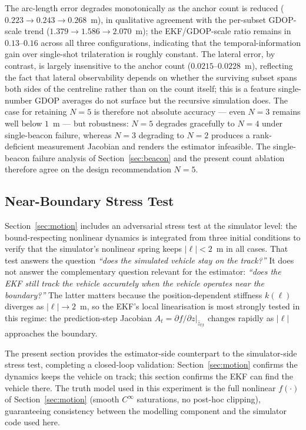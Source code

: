 \documentclass[11pt,a4paper]{article}
\begin{document}
The arc-length error degrades monotonically as the anchor count is
reduced ($0.223\to0.243\to0.268$~m), in qualitative agreement with
the per-subset GDOP-scale trend ($1.379\to1.586\to2.070$~m); the
EKF/GDOP-scale ratio remains in $0.13$--$0.16$ across all three
configurations,
indicating that the temporal-information gain over single-shot
trilateration is roughly constant. The lateral error, by contrast,
is largely insensitive to the anchor count
($0.0215$--$0.0228$~m), reflecting the fact that lateral observability
depends on whether the surviving subset spans both sides of the
centreline rather than on the count itself; this is a feature
single-number GDOP averages do not surface but the recursive
simulation does. The case for retaining $N=5$ is therefore not
absolute accuracy --- even $N=3$ remains well below $1$~m --- but
robustness: $N=5$ degrades gracefully to $N=4$ under single-beacon
failure, whereas $N=3$ degrading to $N=2$ produces a rank-deficient
measurement Jacobian and renders the estimator infeasible. The
single-beacon failure analysis of Section~\ref{sec:beacon} and the
present count ablation therefore agree on the design recommendation
$N=5$.

\subsection{Near-Boundary Stress Test}
\label{sec:bdry}

Section~\ref{sec:motion} includes an adversarial stress test at the
simulator level: the bound-respecting nonlinear dynamics is integrated
from three initial conditions to verify that the simulator's nonlinear
spring keeps $|\ell|<2$~m in all cases. That test answers the question
\emph{``does the simulated vehicle stay on the track?''} It does not
answer the complementary question relevant for the estimator:
\emph{``does the EKF still track the vehicle accurately when the
vehicle operates near the boundary?''} The latter matters because the
position-dependent stiffness $k(\ell)$ diverges as $|\ell|\to2$~m,
so the EKF's local linearisation is most strongly tested in this
regime: the prediction-step Jacobian
$A_t=\partial f/\partial z|_{\hat{z}_{t|t}}$ changes rapidly as
$|\ell|$ approaches the boundary.

The present section provides the estimator-side counterpart to the
simulator-side stress test, completing a closed-loop validation:
Section~\ref{sec:motion} confirms the dynamics keeps the vehicle on
track; this section confirms the EKF can find the vehicle there.
The truth model used in this experiment is the full nonlinear
$f(\cdot)$ of Section~\ref{sec:motion} (smooth $C^{\infty}$
saturations, no post-hoc clipping), guaranteeing consistency between
the modelling component and the simulator code used here.
\end{document}
